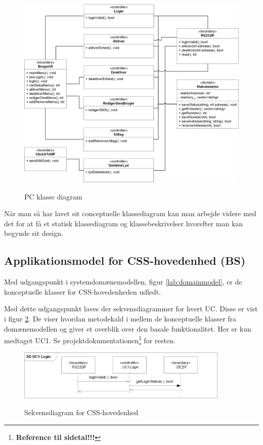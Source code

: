 \clearpage
\begin{figure}[htbp] \centering
{\includegraphics[width=\textwidth]{billeder/uml/PC_class}}
\caption{PC klasse diagram}
\label{lab: PC klasse diagram}
\end{figure}

Når man så har lavet sit conceptuelle klassediagram kan man arbejde videre med det for at få et statisk klassediagram og klassebeskrivelser hvorefter man kan begynde sit design.

%
%
\subsection{Applikationsmodel for CSS-hovedenhed (BS)}
Med udgangspunkt i systemdomænemodellen, figur \ref{lab:domainmodel}, er de konceptuelle klasser for CSS-hovedenheden udledt. 

Med dette udgangspunkt laves der sekvensdiagrammer for hvert UC. Disse er vist i figur \ref{fig:CSS_hovedenhed_sd}. De viser hvordan metodekald i mellem de konceptuelle klasser fra domænemodellen og giver et overblik over den basale funktionalitet. Her er kun medtaget UC1. Se projektdokumentationen\footnote{\textbf{Reference til sidetal!!!}} for resten.

\begin{figure}[!htb]
     \centering
     { \includegraphics[width=0.9\textwidth]{Billeder/UML/CSS_hovedenhed_SD}}
     \caption{Sekvensdiagram for CSS-hovedenhed}
     \label{fig:CSS_hovedenhed_sd}
\end{figure}

